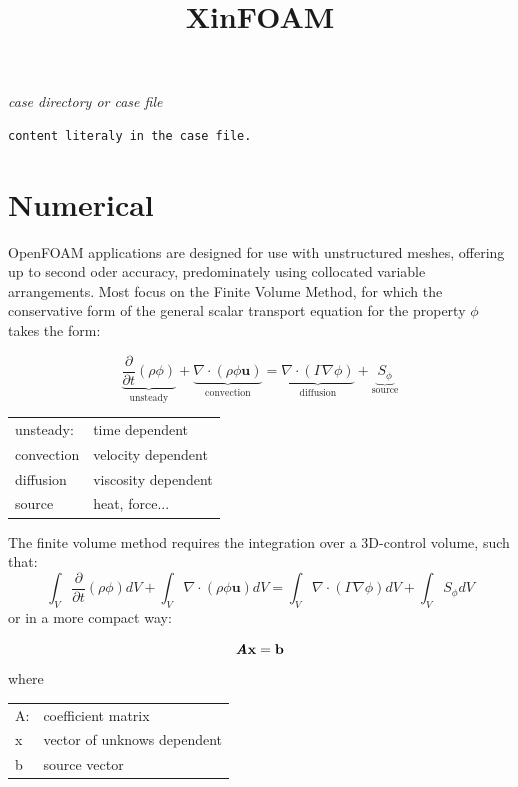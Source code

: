 \documentclass{article}
\title{XinFOAM}
\begin{document}
\maketitle

\noindent
\textit{case directory or case file}
\begin{verbatim}
content literaly in the case file. 
\end{verbatim}
\section{Numerical}
OpenFOAM applications are designed for use with unstructured meshes, offering up to second oder accuracy, predominately using collocated variable arrangements. Most focus on the Finite Volume Method, for which the conservative form of the general scalar transport equation for the property $\phi$ takes the form:

\begin{equation}
\underbrace{\frac{\partial}{\partial t} (\rho\phi)}_{\mathrm{unsteady}} + \underbrace{\nabla \cdot (\rho \phi \textbf{u})}_{\mathrm{convection}} = \underbrace{\nabla \cdot (\Gamma \nabla \phi)}_{\mathrm{diffusion}} + \underbrace{S_{\phi}}_{\mathrm{source}}
\label{eq:transport equation}
\end{equation}


\begin{table}[hbp!]
\begin{tabular}{l l}
	unsteady: &   time dependent\\
	convection & velocity dependent\\
	diffusion & viscosity dependent \\
	source & heat, force...
\end{tabular}
\end{table}
The finite volume method requires the integration over a 3D-control volume, such that:
\begin{equation}
\int_V \frac{\partial}{\partial t} {(\rho \phi)} dV + \int_V \nabla \cdot \left(\rho \phi \textbf{u} \right) dV = \int_V \nabla \cdot \left(\Gamma \nabla \phi \right) dV + \int_V S_\phi dV 
\label{eq:intergal transport equation}
\end{equation}
or in a more compact way:

\begin{equation}
\textit{\textbf{A}}\textbf{x} = \textbf{b}
\end{equation}
where
\begin{table}[hbp!]
\begin{tabular}{l l}
	A: &   coefficient matrix\\
	x & vector of unknows dependent\\
	b & source vector
\end{tabular}
\end{table}
\end{document}
